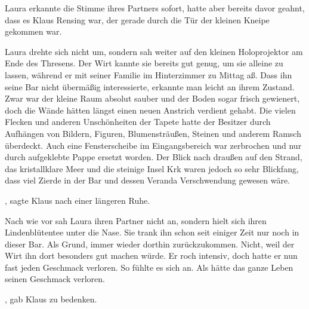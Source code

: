  Laura erkannte die Stimme ihres Partners sofort, hatte aber bereits davor geahnt, dass es Klaus Rensing war, der gerade durch die Tür der kleinen Kneipe gekommen war. 

\par

Laura drehte sich nicht um, sondern sah weiter auf den kleinen Holoprojektor am Ende des Thresens. Der Wirt kannte sie bereits gut genug, um sie alleine zu lassen, während er mit seiner Familie im Hinterzimmer zu Mittag aß. Dass ihn seine Bar nicht übermäßig interessierte, erkannte man leicht an ihrem Zustand. Zwar war der kleine Raum absolut sauber und der Boden sogar frisch gewienert, doch die Wände hätten längst einen neuen Anstrich verdient gehabt. Die vielen Flecken und anderen Unschönheiten der Tapete hatte der Besitzer durch Aufhängen von Bildern, Figuren, Blumensträußen, Steinen und anderem Ramsch überdeckt. Auch eine Fensterscheibe im Eingangsbereich war zerbrochen und nur durch aufgeklebte Pappe ersetzt worden. Der Blick nach draußen auf den Strand, das kristallklare Meer und die steinige Insel Krk waren jedoch so sehr Blickfang, dass viel Zierde in der Bar und dessen Veranda Verschwendung gewesen wäre.

\par

, sagte Klaus nach einer längeren Ruhe. 

\par

Nach wie vor sah Laura ihren Partner nicht an, sondern hielt sich ihren Lindenblütentee unter die Nase. Sie trank ihn schon seit einiger Zeit nur noch in dieser Bar. Als Grund, immer wieder dorthin zurückzukommen. Nicht, weil der Wirt ihn dort besonders gut machen würde. Er roch intensiv, doch hatte er nun fast jeden Geschmack verloren. So fühlte es sich an. Als hätte das ganze Leben seinen Geschmack verloren.

\par

, gab Klaus zu bedenken. 


